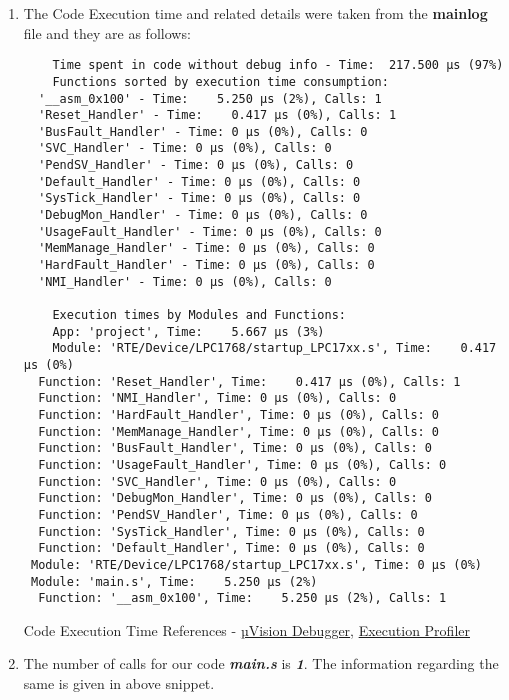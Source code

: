 \documentclass[12pt]{article}
\begin{document}
\begin{enumerate}[label=(\alph*)]
    \item The Code Execution time and related details were taken from the \textbf{mainlog} file and they are as follows:
    \begin{verbatim}
    Time spent in code without debug info - Time:  217.500 µs (97%)
    Functions sorted by execution time consumption:
  '__asm_0x100' - Time:    5.250 µs (2%), Calls: 1
  'Reset_Handler' - Time:    0.417 µs (0%), Calls: 1
  'BusFault_Handler' - Time: 0 µs (0%), Calls: 0
  'SVC_Handler' - Time: 0 µs (0%), Calls: 0
  'PendSV_Handler' - Time: 0 µs (0%), Calls: 0
  'Default_Handler' - Time: 0 µs (0%), Calls: 0
  'SysTick_Handler' - Time: 0 µs (0%), Calls: 0
  'DebugMon_Handler' - Time: 0 µs (0%), Calls: 0
  'UsageFault_Handler' - Time: 0 µs (0%), Calls: 0
  'MemManage_Handler' - Time: 0 µs (0%), Calls: 0
  'HardFault_Handler' - Time: 0 µs (0%), Calls: 0
  'NMI_Handler' - Time: 0 µs (0%), Calls: 0

    Execution times by Modules and Functions:
    App: 'project', Time:    5.667 µs (3%)
    Module: 'RTE/Device/LPC1768/startup_LPC17xx.s', Time:    0.417 µs (0%)
  Function: 'Reset_Handler', Time:    0.417 µs (0%), Calls: 1
  Function: 'NMI_Handler', Time: 0 µs (0%), Calls: 0
  Function: 'HardFault_Handler', Time: 0 µs (0%), Calls: 0
  Function: 'MemManage_Handler', Time: 0 µs (0%), Calls: 0
  Function: 'BusFault_Handler', Time: 0 µs (0%), Calls: 0
  Function: 'UsageFault_Handler', Time: 0 µs (0%), Calls: 0
  Function: 'SVC_Handler', Time: 0 µs (0%), Calls: 0
  Function: 'DebugMon_Handler', Time: 0 µs (0%), Calls: 0
  Function: 'PendSV_Handler', Time: 0 µs (0%), Calls: 0
  Function: 'SysTick_Handler', Time: 0 µs (0%), Calls: 0
  Function: 'Default_Handler', Time: 0 µs (0%), Calls: 0
 Module: 'RTE/Device/LPC1768/startup_LPC17xx.s', Time: 0 µs (0%)
 Module: 'main.s', Time:    5.250 µs (2%)
  Function: '__asm_0x100', Time:    5.250 µs (2%), Calls: 1
    \end{verbatim}
Code Execution Time References - \href{https://www.keil.com/support/docs/971.htm}{µVision Debugger}, \href{https://www.keil.com/support/man/docs/uv4/uv4_db_dbg_execprofiler.htm}{Execution Profiler}    
    
    \item  The number of calls for our code \textbf{\textit{main.s}} is \textbf{\textit{1}}. The information regarding the same is given in above snippet.


\end{enumerate}

\end{document}
